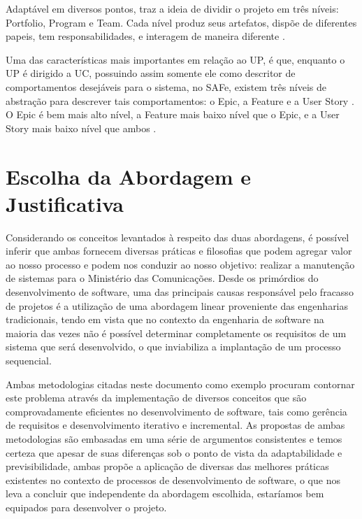 Adaptável em diversos pontos, traz a ideia de dividir o projeto em três níveis: Portfolio, Program e Team. Cada nível produz seus artefatos, dispõe de diferentes papeis, tem responsabilidades, e interagem de maneira diferente \cite[p. 124-125]{safe001}.

Uma das características mais importantes em relação ao UP, é que, enquanto o UP é dirigido a UC, possuindo assim somente ele como descritor de comportamentos desejáveis para o sistema, no SAFe, existem três níveis de abstração para descrever tais comportamentos: o Epic, a Feature e a User Story \cite[p. 182-183]{safe001}. O Epic é bem mais alto nível, a Feature mais baixo nível que o Epic, e a User Story mais baixo nível que ambos \cite[p. 182-183]{safe001}.

\section{Escolha da Abordagem e Justificativa}
Considerando os conceitos levantados à respeito das duas abordagens, é possível inferir que ambas fornecem diversas práticas e filosofias que podem agregar valor ao nosso processo e podem nos conduzir ao nosso objetivo: realizar a manutenção de sistemas para o Ministério das Comunicações. Desde os primórdios do desenvolvimento de software, uma das principais causas responsável pelo fracasso de projetos é a utilização de uma abordagem linear proveniente das engenharias tradicionais, tendo em vista que no contexto da engenharia de software na maioria das vezes não é possível determinar completamente os requisitos de um sistema que será desenvolvido, o que inviabiliza a implantação de um processo sequencial.

Ambas metodologias citadas neste documento como exemplo procuram contornar este problema através da implementação de diversos conceitos que são comprovadamente eficientes no desenvolvimento de software, tais como gerência de requisitos e desenvolvimento iterativo e incremental. As propostas de ambas metodologias são embasadas em uma série de argumentos consistentes e temos certeza que apesar de suas diferenças sob o ponto de vista da adaptabilidade e previsibilidade, ambas propõe a aplicação de diversas das melhores práticas existentes no contexto de processos de desenvolvimento de software, o que nos leva a concluir que independente da abordagem escolhida, estaríamos bem equipados para desenvolver o projeto.

